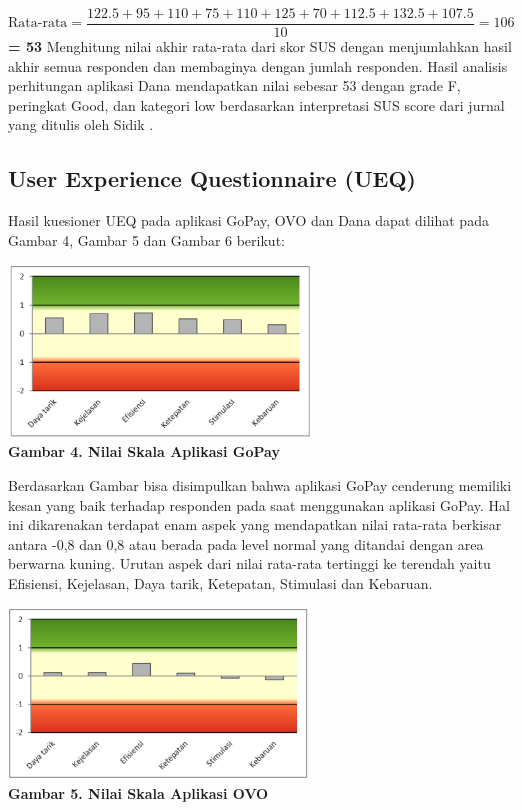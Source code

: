 \documentclass[
 manuscript=article,  %
  layout=publish, 
  year=2024, 
  month= Februari, %
  volume=8,
  number=1 
]{JIKO}
\begin{document}
\[
\text{Rata-rata} = \frac{122.5 + 95 + 110 + 75 + 110 + 125 + 70 + 112.5 + 132.5 + 107.5}{10} = 106
\]
\textbf{= 53}
Menghitung nilai akhir rata-rata dari skor SUS dengan menjumlahkan hasil akhir semua responden dan membaginya dengan jumlah responden. Hasil analisis perhitungan aplikasi Dana mendapatkan nilai sebesar 53 dengan grade F, peringkat Good, dan kategori low berdasarkan interpretasi SUS score dari jurnal yang ditulis oleh Sidik \cite{9}.


\subsection{User Experience Questionnaire (UEQ)}
Hasil kuesioner UEQ pada aplikasi GoPay, OVO dan Dana dapat dilihat pada Gambar 4, Gambar 5 dan Gambar 6 berikut:
\begin{center}
    \includegraphics[width=0.6\textwidth]{assets/gambar4.jpg}
    \\\textbf{Gambar 4. Nilai Skala Aplikasi GoPay}
\end{center}



Berdasarkan Gambar  bisa disimpulkan bahwa aplikasi GoPay cenderung memiliki kesan yang baik terhadap responden pada saat menggunakan aplikasi GoPay. Hal ini dikarenakan terdapat enam aspek yang mendapatkan nilai rata-rata berkisar antara -0,8 dan 0,8 atau berada pada level normal yang ditandai dengan area berwarna kuning. Urutan aspek dari nilai rata-rata tertinggi ke terendah yaitu Efisiensi, Kejelasan, Daya tarik, Ketepatan, Stimulasi dan Kebaruan.
\begin{center}
    \includegraphics[width=0.6\textwidth]{assets/gambar5.jpg}
    \\\textbf{Gambar 5. Nilai Skala Aplikasi OVO}
\end{center}
\end{document}
